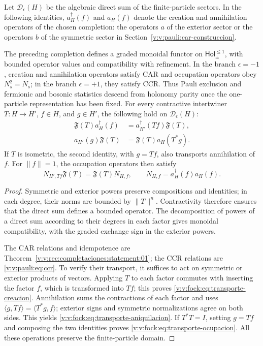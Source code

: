 Let \(\mathcal D_\epsilon(H)\) be the algebraic direct sum of the
finite-particle sectors. In the following identities, \(a_H^\dagger(f)\)
and \(a_H(f)\) denote the creation and annihilation operators of the
chosen completion: the operators \(a\) of the exterior sector or the
operators \(b\) of the symmetric sector in
Section~\ref{v:v:pauli:car-construccion}.

\begin{theorem}
\label{v:v:rec:fock_gibbs:statement:01}
The preceding completion defines a graded monoidal functor on
\(\mathsf{Hol}_{\pm}^{\leq1}\), with bounded operator values and
compatibility with refinement. In the branch \(\epsilon=-1\), creation and
annihilation operators satisfy CAR and occupation operators obey
\(N_s^2=N_s\); in the branch \(\epsilon=+1\), they satisfy CCR. Thus
Pauli exclusion and fermionic and bosonic statistics descend from
holonomy parity once the one-particle representation has been fixed.
For every contractive intertwiner \(T:H\to H'\), \(f\in H\), and
\(g\in H'\), the following hold on \(\mathcal D_\epsilon(H)\):
\begin{align}
 \mathfrak F(T)a_H^\dagger(f)
 &=a_{H'}^\dagger(Tf)\mathfrak F(T),
 \label{v:v:fock:eq:transporte-creacion}\\
 a_{H'}(g)\mathfrak F(T)
 &=\mathfrak F(T)a_H(T^*g).
 \label{v:v:fock:eq:transporte-aniquilacion}
\end{align}
If \(T\) is isometric, the second identity, with \(g=Tf\), also transports
annihilation of \(f\). For \(\|f\|=1\), the occupation operators
then satisfy
\begin{equation}
 N_{H',Tf}\mathfrak F(T)=\mathfrak F(T)N_{H,f},
 \qquad N_{H,f}=a_H^\dagger(f)a_H(f).
 \label{v:v:fock:eq:transporte-ocupacion}
\end{equation}
\end{theorem}

\begin{proof}
Symmetric and exterior powers preserve compositions and identities;
in each degree, their norms are bounded by \(\|T\|^n\). Contractivity
therefore ensures that the direct sum defines a bounded operator. The
decomposition of powers of a direct sum according to their degrees in each
factor gives monoidal compatibility, with the graded exchange sign
in the exterior powers.

The CAR relations and idempotence are
Theorem~\ref{v:v:rec:completaciones:statement:01}; the CCR relations are
\eqref{v:v:pauli:eq:ccr}. To verify their transport, it suffices to act on
symmetric or exterior products of vectors. Applying \(T\) to each factor
commutes with inserting the factor \(f\), which is transformed into \(Tf\);
this proves \eqref{v:v:fock:eq:transporte-creacion}. Annihilation sums the
contractions of each factor and uses
\(\langle g,Tf\rangle=\langle T^*g,f\rangle\); exterior signs and
symmetric normalizations agree on both sides. This yields
\eqref{v:v:fock:eq:transporte-aniquilacion}. If \(T^*T=I\), setting \(g=Tf\)
and composing the two identities proves
\eqref{v:v:fock:eq:transporte-ocupacion}. All these operations preserve
the finite-particle domain.
\end{proof}

